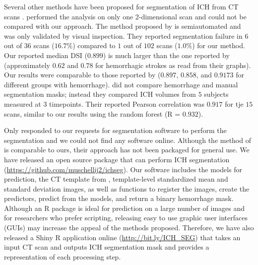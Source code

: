 \documentclass{elsarticle_nonatbib}\usepackage[]{graphicx}\usepackage[]{color}
\begin{document}
Several other methods have been proposed for segmentation of ICH from CT scans \citep{ gillebert_automated_2014, prakash_segmentation_2012, loncaric_hierarchical_1996, loncaric_quantitative_1999, perez_set_2007}.  \citet{loncaric_hierarchical_1996} performed the analysis on only one 2-dimensional scan and could not be compared with our approach.  The method proposed by \citet{perez_set_2007} is semiautomated and was only validated by visual inspection.  They reported segmentation failure in $6$ out of $36$ scans ($16.7\%$) compared to $1$ out of $102$ scans ($1.0\%$) for our method.   Our reported median DSI ($0.899$) is much larger than the one reported by \citet{gillebert_automated_2014} (approximately $0.62$ and $0.78$ for hemorrhagic strokes as read from their graphs). Our results were comparable to those reported by \citep{prakash_segmentation_2012} ($0.897$, $0.858$, and $0.9173$ for different groups with hemorrhage). \citet{loncaric_quantitative_1999} did not compare hemorrhage and manual segmentation masks; instead they compared ICH volumes from $5$ subjects measured at $3$ timepoints.  Their reported Pearson correlation was $0.917$ for tje $15$ scans, similar to our results using the random forest (R = $0.932$).  

Only \citet{gillebert_automated_2014} responded to our requests for segmentation software to perform the segmentation and we could not find any software online.  Although the method of \citet{gillebert_automated_2014} is comparable to ours, their approach has not been packaged for general use.  We have released an open source package that can perform ICH segmentation (\url{https://github.com/muschellij2/ichseg}).  Our software includes the models for prediction, the CT template from \citet{rorden_age-specific_2012}, template-level standardized mean and standard deviation images, as well as functions to register the images, create the predictors, predict from the models, and return a binary hemorrhage mask.  Although an R package is ideal for prediction on a large number of images and for researchers who prefer scripting, releasing easy to use graphic user interfaces (GUIs) may increase the appeal of the methods proposed. Therefore, we have also released a Shiny \citep{shiny} R application online (\url{http://bit.ly/ICH_SEG}) that takes an input CT scan and outputs ICH segmentation mask and provides a representation of each processing step.  
\end{document}

